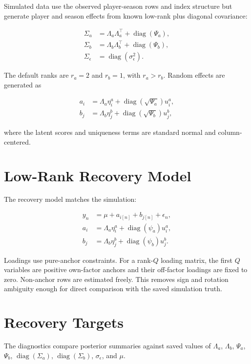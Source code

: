 \documentclass[11pt]{article}
\begin{document}
Simulated data use the observed player-season rows and index structure but generate player and
season effects from known low-rank plus diagonal covariance:

\begin{align}
\Sigma_a &= \Lambda_a \Lambda_a^\top + \operatorname{diag}(\Psi_a), \\
\Sigma_b &= \Lambda_b \Lambda_b^\top + \operatorname{diag}(\Psi_b), \\
\Sigma_\epsilon &= \operatorname{diag}(\sigma_\epsilon^2).
\end{align}

The default ranks are $r_a = 2$ and $r_b = 1$, with $r_a > r_b$. Random effects are generated as

\begin{align}
a_i &= \Lambda_a \eta_i^a + \operatorname{diag}(\sqrt{\Psi_a}) u_i^a, \\
b_j &= \Lambda_b \eta_j^b + \operatorname{diag}(\sqrt{\Psi_b}) u_j^b,
\end{align}

where the latent scores and uniqueness terms are standard normal and column-centered.

\section{Low-Rank Recovery Model}

The recovery model matches the simulation:

\begin{align}
y_n &= \mu + a_{i[n]} + b_{j[n]} + \epsilon_n, \\
a_i &= \Lambda_a \eta_i^a + \operatorname{diag}(\psi_a) u_i^a, \\
b_j &= \Lambda_b \eta_j^b + \operatorname{diag}(\psi_b) u_j^b.
\end{align}

Loadings use pure-anchor constraints. For a rank-$Q$ loading matrix, the first $Q$ variables are
positive own-factor anchors and their off-factor loadings are fixed to zero. Non-anchor rows are
estimated freely. This removes sign and rotation ambiguity enough for direct comparison with
the saved simulation truth.

\section{Recovery Targets}

The diagnostics compare posterior summaries against saved values of
$\Lambda_a$, $\Lambda_b$, $\Psi_a$, $\Psi_b$, $\operatorname{diag}(\Sigma_a)$,
$\operatorname{diag}(\Sigma_b)$, $\sigma_\epsilon$, and $\mu$.
\end{document}
